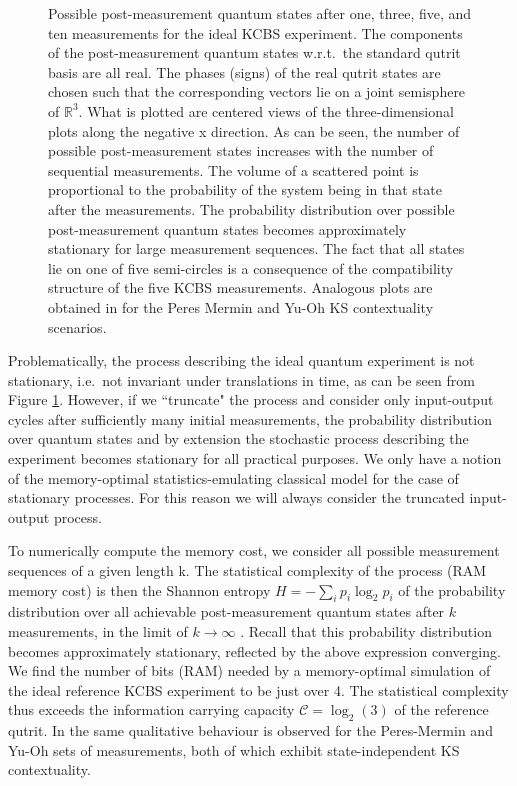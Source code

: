 \begin{figure}
        \caption{Possible post-measurement quantum states after one, three, five, and ten measurements for the ideal KCBS experiment. The components of the post-measurement quantum states w.r.t.\ the standard qutrit basis are all real. The phases (signs) of the real qutrit states are chosen such that the corresponding vectors lie on a joint semisphere of $\mathbb{R}^3$. What is plotted are centered views of the three-dimensional plots along the negative x direction. As can be seen, the number of possible post-measurement states increases with the number of sequential measurements. The volume of a scattered point is proportional to the probability of the system being in that state after the measurements. The probability distribution over possible post-measurement quantum states becomes approximately stationary for large measurement sequences. The fact that all states lie on one of five semi-circles is a consequence of the compatibility structure of the five KCBS measurements. Analogous plots are obtained in \cite{Cabello2018} for the Peres Mermin and Yu-Oh KS contextuality scenarios.}
        \label{fig:causalstates}
    \end{figure}

Problematically, the process describing the ideal quantum experiment is not stationary, i.e.\ not invariant under translations in time, as can be seen from Figure \ref{fig:causalstates}. However, if we ``truncate" the process and consider only input-output cycles after sufficiently many initial measurements, the probability distribution over quantum states and by extension the stochastic process describing the experiment becomes stationary for all practical purposes. We only have a notion of the memory-optimal statistics-emulating classical model for the case of stationary processes. For this reason we will always consider the truncated input-output process.

To numerically compute the memory cost, we consider all possible measurement sequences of a given length k. The statistical complexity of the process (RAM memory cost) is then the Shannon entropy $H=-\sum_ip_i\log_2p_i$ of the probability distribution over all achievable post-measurement quantum states after $k$ measurements, in the limit of $k\rightarrow\infty$ \cite{Cabello2018,Barnett2015}. Recall that this probability distribution becomes approximately stationary, reflected by the above expression converging. We find the number of bits (RAM) needed by a memory-optimal simulation of the ideal reference KCBS experiment to be just over 4. The statistical complexity thus exceeds the information carrying capacity $\mathcal{C}=\log_2(3)$ of the reference qutrit. In \cite{Cabello2018} the same qualitative behaviour is observed for the Peres-Mermin and Yu-Oh sets of measurements, both of which exhibit state-independent KS contextuality. 

